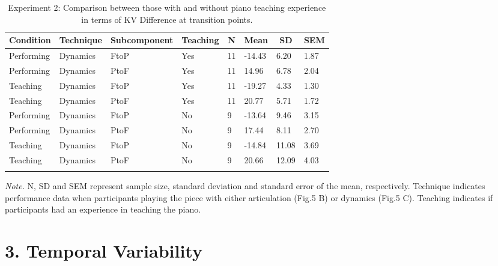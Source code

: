 \documentclass[
  man,floatsintext]{apa6}
\begin{document}
\begin{table}[tbp]

\begin{center}
\begin{threeparttable}

\caption{\label{tab:dyn-diff-teaching-desc-2}Experiment 2: Comparison between those with and without piano teaching experience in terms of KV Difference at transition points.}

\begin{tabular}{llllllll}
\toprule
Condition & \multicolumn{1}{c}{Technique} & \multicolumn{1}{c}{Subcomponent} & \multicolumn{1}{c}{Teaching} & \multicolumn{1}{c}{N} & \multicolumn{1}{c}{Mean} & \multicolumn{1}{c}{SD} & \multicolumn{1}{c}{SEM}\\
\midrule
Performing & Dynamics & FtoP & Yes & 11 & -14.43 & 6.20 & 1.87\\
Performing & Dynamics & PtoF & Yes & 11 & 14.96 & 6.78 & 2.04\\
Teaching & Dynamics & FtoP & Yes & 11 & -19.27 & 4.33 & 1.30\\
Teaching & Dynamics & PtoF & Yes & 11 & 20.77 & 5.71 & 1.72\\
Performing & Dynamics & FtoP & No & 9 & -13.64 & 9.46 & 3.15\\
Performing & Dynamics & PtoF & No & 9 & 17.44 & 8.11 & 2.70\\
Teaching & Dynamics & FtoP & No & 9 & -14.84 & 11.08 & 3.69\\
Teaching & Dynamics & PtoF & No & 9 & 20.66 & 12.09 & 4.03\\
\bottomrule
\addlinespace
\end{tabular}

\begin{tablenotes}[para]
\normalsize{\textit{Note.} N, SD and SEM represent sample size, standard deviation and standard error of the mean, respectively. Technique indicates performance data when participants playing the piece with either articulation (Fig.5 B) or dynamics (Fig.5 C). Teaching indicates if participants had an experience in teaching the piano.}
\end{tablenotes}

\end{threeparttable}
\end{center}

\end{table}

\clearpage

\hypertarget{temporal-variability}{%
\section{3. Temporal Variability}\label{temporal-variability}}
\end{document}
